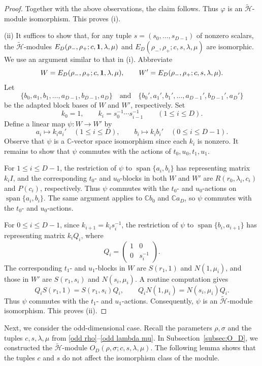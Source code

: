 \documentclass[reqno]{amsart}
\theoremstyle{definition}
\begin{document}
\begin{proof}
Together with the above observations, the claim follows.
Thus $\varphi$ is an
$\widetilde{\mathcal{H}}$-module isomorphism.
This proves (i).

(ii)
It suffices to show that, for any tuple
$s=(s_0,\dots,s_{D-1})$ of nonzero scalars, the
$\widetilde{\mathcal{H}}$-modules
$E_D(\rho_-,\rho_+;c,{\bf 1},\lambda,\mu)$ and
$E_D(\rho_-,\rho_+;c,s,\lambda,\mu)$
are isomorphic.
We use an argument similar to that in (i).
Abbreviate
$$
W=E_D(\rho_-,\rho_+;c,{\bf 1},\lambda,\mu),
\qquad
W'=E_D(\rho_-,\rho_+;c,s,\lambda,\mu).
$$
Let
$$
\{b_0,a_1,b_1,\dots,a_{D-1},b_{D-1},a_D\}
\quad \text{and} \quad
\{b_0',a_1',b_1',\dots,a_{D-1}',b_{D-1}',a_D'\}
$$
be the adapted block bases of $W$ and $W'$, respectively.
Set
$$
k_0=1,
\qquad
k_i=s_0^{-1}\cdots s_{i-1}^{-1}
\qquad (1\leq i\leq D).
$$
Define a linear map
$\psi:W\to W'$
by
$$
a_i\mapsto k_i a_i'
\quad (1\leq i\leq D),
\qquad
b_i\mapsto k_i b_i'
\quad (0\leq i\leq D-1).
$$
Observe that $\psi$ is a $\mathbb{C}$-vector space isomorphism
since each $k_i$ is nonzero.
It remains to show that $\psi$ commutes with the actions of
$t_0,u_0,t_1,u_1$.

For $1\leq i\leq D-1$, the restriction of $\psi$ to
$\operatorname{span}\{a_i,b_i\}$ has representing matrix $k_iI$,
and the corresponding $t_0$- and $u_0$-blocks in both $W$ and $W'$
are $R(r_0,\lambda_i,c_i)$ and $P(c_i)$, respectively.
Thus $\psi$ commutes with the $t_0$- and $u_0$-actions on
$\operatorname{span}\{a_i,b_i\}$.
The same argument applies to $\mathbb{C}b_0$ and
$\mathbb{C}a_D$, so $\psi$ commutes with the $t_0$- and $u_0$-actions.

For $0\leq i\leq D-1$, since $k_{i+1}=k_is_i^{-1}$, the restriction
of $\psi$ to $\operatorname{span}\{b_i,a_{i+1}\}$ has representing
matrix $k_iQ_i$, where
$$
Q_i=
\begin{pmatrix}
1&0\\
0&s_i^{-1}
\end{pmatrix}.
$$
The corresponding $t_1$- and $u_1$-blocks in $W$ are
$S(r_1,1)$ and $N(1,\mu_i)$, and those in $W'$ are
$S(r_1,s_i)$ and $N(s_i,\mu_i)$.
A routine computation gives
$$
Q_iS(r_1,1)=S(r_1,s_i)Q_i,
\qquad
Q_iN(1,\mu_i)=N(s_i,\mu_i)Q_i.
$$
Thus $\psi$ commutes with the $t_1$- and $u_1$-actions.
Consequently, $\psi$ is an
$\widetilde{\mathcal{H}}$-module isomorphism.
This proves (ii).
%
\end{proof}

Next, we consider the odd-dimensional case.
Recall the parameters $\rho,\sigma$ and the tuples
$c,s,\lambda,\mu$ from
\eqref{odd rho}--\eqref{odd lambda mu}.
In Subsection~\ref{subsec:O_D}, we constructed the
$\widetilde{\mathcal{H}}$-module
$O_D(\rho,\sigma;c,s,\lambda,\mu)$.
The following lemma shows that the tuples $c$ and $s$ do not affect
the isomorphism class of the module.
\end{document}
